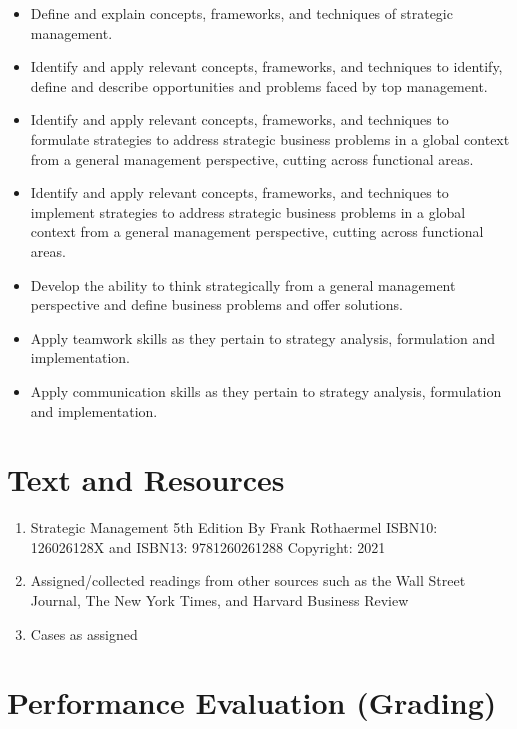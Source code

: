 \documentclass[
]{book}
\providecommand{\tightlist}{%
  \setlength{\itemsep}{0pt}\setlength{\parskip}{0pt}}
\begin{document}
\begin{itemize}
\tightlist
\item
  Define and explain concepts, frameworks, and techniques of strategic management.
\item
  Identify and apply relevant concepts, frameworks, and techniques to identify, define and describe opportunities and problems faced by top management.
\item
  Identify and apply relevant concepts, frameworks, and techniques to formulate strategies to address strategic business problems in a global context from a general management perspective, cutting across functional areas.
\item
  Identify and apply relevant concepts, frameworks, and techniques to implement strategies to address strategic business problems in a global context from a general management perspective, cutting across functional areas.
\item
  Develop the ability to think strategically from a general management perspective and define business problems and offer solutions.
\item
  Apply teamwork skills as they pertain to strategy analysis, formulation and implementation.
\item
  Apply communication skills as they pertain to strategy analysis, formulation and implementation.
\end{itemize}

\hypertarget{text-and-resources}{%
\section*{Text and Resources}\label{text-and-resources}}

\begin{enumerate}
\def\labelenumi{\arabic{enumi}.}
\tightlist
\item
  Strategic Management 5th Edition By Frank Rothaermel ISBN10: 126026128X and ISBN13: 9781260261288
  Copyright: 2021
\item
  Assigned/collected readings from other sources such as the Wall Street Journal, The New York Times, and Harvard Business Review
\item
  Cases as assigned
\end{enumerate}

\hypertarget{performance-evaluation-grading}{%
\section*{Performance Evaluation (Grading)}\label{performance-evaluation-grading}}
\end{document}
